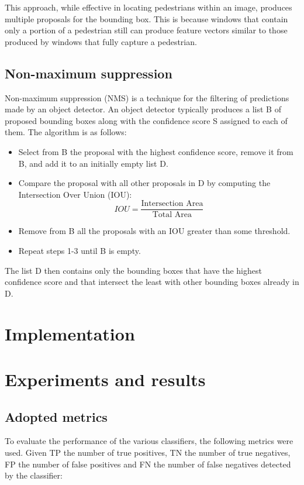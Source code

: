 \documentclass[journal,twocolumn]{IEEEtran}
\begin{document}
This approach, while effective in locating pedestrians within
an image, produces multiple proposals for the bounding box.
This is because windows that contain only a portion of a
pedestrian still can produce feature vectors similar to those produced by windows that fully capture a pedestrian.

\subsection{Non-maximum suppression}

Non-maximum suppression (NMS) is a technique for the
filtering of predictions made by an object detector. An object
detector typically produces a list B of proposed bounding
boxes along with the confidence score S assigned to each of
them. The algorithm is as follows:
\begin{itemize}
\item Select from B the proposal with the highest confidence
score, remove it from B, and add it to an initially empty
list D.
\item Compare the proposal with all other proposals in D by
computing the Intersection Over Union (IOU):
\begin{equation*}
IOU=\frac{\text{Intersection Area}}{\text{Total Area}}
\end{equation*}
\item Remove from B all the proposals with an IOU greater
than some threshold.
\item Repeat steps 1-3 until B is empty.
\end{itemize}

The list D then contains only the bounding boxes that have the highest confidence score and that intersect the least with other bounding boxes already in D.

\section{Implementation}
\label{sec:imp}

\section{Experiments and results}
\label{sec:exp}

\subsection{Adopted metrics}

To evaluate the performance of the various classifiers, the following metrics were used. Given TP the number of true positives, TN the number of true negatives, FP the number of false positives and FN the number of false negatives detected by the classifier:
\end{document}
